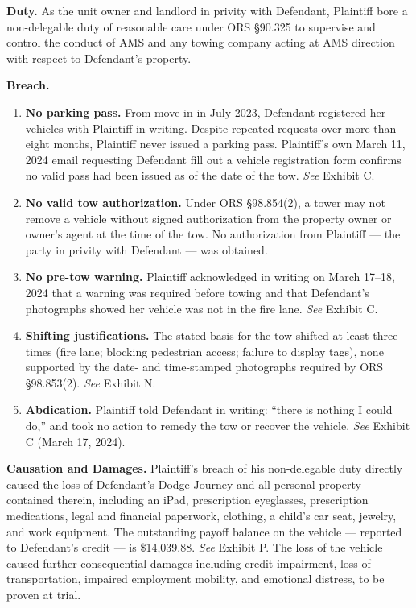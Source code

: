 \documentclass[12pt,letterpaper]{article}
\begin{document}
\textbf{Duty.} As the unit owner and landlord in privity with Defendant, Plaintiff bore a non-delegable duty of reasonable care under ORS \S90.325 to supervise and control the conduct of AMS and any towing company acting at AMS direction with respect to Defendant's property.

\textbf{Breach.}

\begin{enumerate}[label=(\alph*)]
  \item \textbf{No parking pass.} From move-in in July 2023, Defendant registered her vehicles with Plaintiff in writing. Despite repeated requests over more than eight months, Plaintiff never issued a parking pass. Plaintiff's own March 11, 2024 email requesting Defendant fill out a vehicle registration form confirms no valid pass had been issued as of the date of the tow. \textit{See} Exhibit C.
  \item \textbf{No valid tow authorization.} Under ORS \S98.854(2), a tower may not remove a vehicle without signed authorization from the property owner or owner's agent at the time of the tow. No authorization from Plaintiff --- the party in privity with Defendant --- was obtained.
  \item \textbf{No pre-tow warning.} Plaintiff acknowledged in writing on March 17--18, 2024 that a warning was required before towing and that Defendant's photographs showed her vehicle was not in the fire lane. \textit{See} Exhibit C.
  \item \textbf{Shifting justifications.} The stated basis for the tow shifted at least three times (fire lane; blocking pedestrian access; failure to display tags), none supported by the date- and time-stamped photographs required by ORS \S98.853(2). \textit{See} Exhibit N.
  \item \textbf{Abdication.} Plaintiff told Defendant in writing: ``there is nothing I could do,'' and took no action to remedy the tow or recover the vehicle. \textit{See} Exhibit C (March 17, 2024).
\end{enumerate}

\textbf{Causation and Damages.} Plaintiff's breach of his non-delegable duty directly caused the loss of Defendant's Dodge Journey and all personal property contained therein, including an iPad, prescription eyeglasses, prescription medications, legal and financial paperwork, clothing, a child's car seat, jewelry, and work equipment. The outstanding payoff balance on the vehicle --- reported to Defendant's credit --- is \$14,039.88. \textit{See} Exhibit P. The loss of the vehicle caused further consequential damages including credit impairment, loss of transportation, impaired employment mobility, and emotional distress, to be proven at trial.
\end{document}
